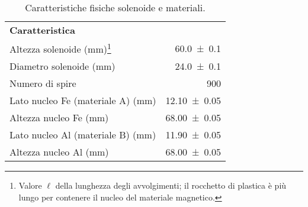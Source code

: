 \squeezetable
\begin{table}[h]
    \begin{ruledtabular}
        \caption{Caratteristiche fisiche solenoide e materiali.}
        \label{tab:L_caratt}
        \begin{tabular}{lr}
            \bf{Caratteristica} & \\
            \colrule
            Altezza solenoide (mm)\footnote{Valore $\ell$ della lunghezza degli avvolgimenti; il rocchetto di plastica è più lungo per contenere il nucleo del materiale magnetico.}              
                                                & \SI{60.0  +- 0.1 }{} \\
            Diametro solenoide (mm)             & \SI{24.0  +- 0.1 }{} \\
            Numero di spire                     & \SI{900          }{} \\
            Lato nucleo Fe (materiale A) (mm)   & \SI{12.10 +- 0.05}{} \\
            Altezza nucleo Fe (mm)              & \SI{68.00 +- 0.05}{} \\
            Lato nucleo Al (materiale B) (mm)   & \SI{11.90 +- 0.05}{} \\
            Altezza nucleo Al (mm)              & \SI{68.00 +- 0.05}{} \\
        \end{tabular}
    \end{ruledtabular}
\end{table}